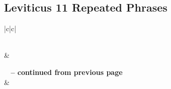 \subsection{Leviticus 11 Repeated Phrases}


\normalsize
 
\begin{center}
\begin{longtable}{|c|c|}
\caption[Leviticus 11 Repeated Phrases]{Leviticus 11 Repeated Phrases}\label{table:Repeated Phrases Leviticus 11} \\
\hline {} &  \\ \hline 
\endfirsthead
 
{{\bfseries \tablename\ \thetable{} -- continued from previous page}} \\  
\hline {} &  \\ \hline 
\endhead
 

\end{longtable}
\end{center}
